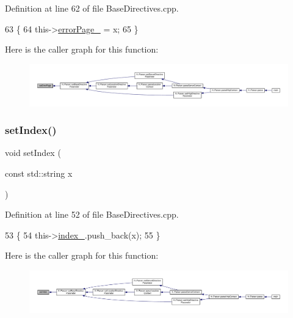 Definition at line 62 of file Base\+Directives.\+cpp.


\begin{DoxyCode}
63     \{
64         this->\hyperlink{classft_1_1_base_directives_a5c0d388109f086503961de84fe3fce90}{errorPage\_} = x;
65     \}
\end{DoxyCode}
Here is the caller graph for this function\+:
\nopagebreak
\begin{figure}[H]
\begin{center}
\leavevmode
\includegraphics[width=350pt]{classft_1_1_base_directives_a505ecc88b3e1779583ad60cc243c7769_icgraph}
\end{center}
\end{figure}
\mbox{\label{classft_1_1_base_directives_a6d3d8fd6eaaf71304128af6b3cee2a69}} 
\subsubsection{\texorpdfstring{set\+Index()}{setIndex()}}
{\footnotesize\ttfamily void set\+Index (\begin{DoxyParamCaption}\item[{const std\+::string}]{x }\end{DoxyParamCaption})\hspace{0.3cm}{\ttfamily [inherited]}}



Definition at line 52 of file Base\+Directives.\+cpp.


\begin{DoxyCode}
53     \{
54         this->\hyperlink{classft_1_1_base_directives_a6ba30626837f300201cd32c35d50aa49}{index\_}.push\_back(x);
55     \}
\end{DoxyCode}
Here is the caller graph for this function\+:
\nopagebreak
\begin{figure}[H]
\begin{center}
\leavevmode
\includegraphics[width=350pt]{classft_1_1_base_directives_a6d3d8fd6eaaf71304128af6b3cee2a69_icgraph}
\end{center}
\end{figure}
\mbox{\label{classft_1_1_base_directives_a0818b8529872ba9622329e2118d20c39}} 
